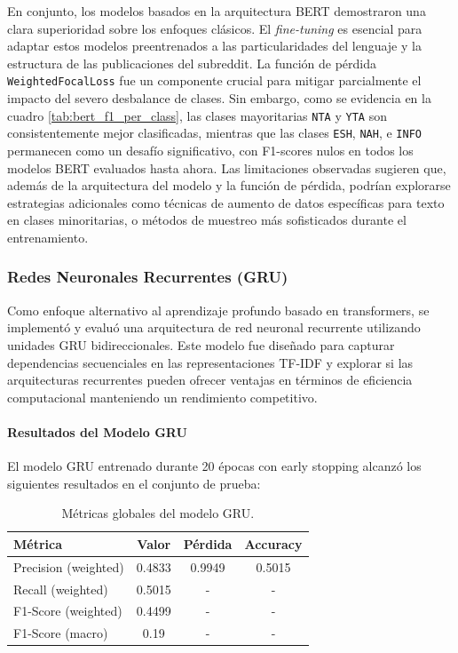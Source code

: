 En conjunto, los modelos basados en la arquitectura BERT demostraron una clara superioridad sobre los enfoques clásicos. El \textit{fine-tuning} es esencial para adaptar estos modelos preentrenados a las particularidades del lenguaje y la estructura de las publicaciones del subreddit.
La función de pérdida \texttt{WeightedFocalLoss} fue un componente crucial para mitigar parcialmente el impacto del severo desbalance de clases. Sin embargo, como se evidencia en la cuadro \ref{tab:bert_f1_per_class}, las clases mayoritarias \texttt{NTA} y \texttt{YTA} son consistentemente mejor clasificadas, mientras que las clases \texttt{ESH}, \texttt{NAH}, e \texttt{INFO} permanecen como un desafío significativo, con F1-scores nulos en todos los modelos BERT evaluados hasta ahora.
Las limitaciones observadas sugieren que, además de la arquitectura del modelo y la función de pérdida, podrían explorarse estrategias adicionales como técnicas de aumento de datos específicas para texto en clases minoritarias, o métodos de muestreo más sofisticados durante el entrenamiento. 

\subsubsection{Redes Neuronales Recurrentes (GRU)}

Como enfoque alternativo al aprendizaje profundo basado en transformers, se implementó y evaluó una arquitectura de red neuronal recurrente utilizando unidades GRU bidireccionales. Este modelo fue diseñado para capturar dependencias secuenciales en las representaciones TF-IDF y explorar si las arquitecturas recurrentes pueden ofrecer ventajas en términos de eficiencia computacional manteniendo un rendimiento competitivo.

\paragraph{Resultados del Modelo GRU}

El modelo GRU entrenado durante 20 épocas con early stopping alcanzó los siguientes resultados en el conjunto de prueba:

\begin{table}[H]
\centering
\caption{Métricas globales del modelo GRU.}
\begin{tabular}{lccc}
\toprule
\textbf{Métrica} & \textbf{Valor} & \textbf{Pérdida} & \textbf{Accuracy} \\
\midrule
Precision (weighted) & 0.4833 & 0.9949 & 0.5015 \\
Recall (weighted) & 0.5015 & - & - \\
F1-Score (weighted) & 0.4499 & - & - \\
F1-Score (macro) & 0.19 & - & - \\
\bottomrule
\end{tabular}
\end{table}

